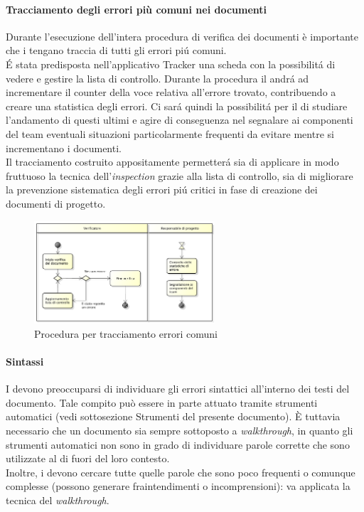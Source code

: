 			\paragraph{Tracciamento degli errori più comuni nei documenti}
			Durante l'esecuzione dell'intera procedura di verifica dei documenti è importante che i  tengano traccia di tutti gli errori pi\'u comuni. \\
			\'E stata predisposta nell'applicativo Tracker una scheda con la possibilit\'a di vedere e gestire la lista di controllo. Durante la procedura il  andr\'a ad incrementare il counter della voce relativa all'errore trovato, contribuendo a creare una statistica degli errori. Ci sar\'a quindi la possibilit\'a per il  di studiare l'andamento di questi ultimi e agire di conseguenza nel segnalare ai componenti del team eventuali situazioni particolarmente frequenti da evitare mentre si incrementano i documenti.\\
			Il tracciamento costruito appositamente permetter\'a sia di applicare in modo fruttuoso la tecnica dell'\textit{inspection} grazie alla lista di controllo, sia di migliorare la prevenzione sistematica degli errori pi\'u critici in fase di creazione dei documenti di progetto.
			\begin{figure}[H]
					\centering
					\includegraphics[width=0.6\textwidth]{NormeDiProgetto/Pics/ProceduraDecrementoErrori}
					\caption{Procedura per tracciamento errori comuni}
			\end{figure}
			\paragraph{Sintassi}
				I  devono preoccuparsi di individuare gli errori sintattici all'interno dei testi del documento. Tale compito può essere in parte attuato tramite strumenti automatici (vedi sottosezione Strumenti del presente documento). È tuttavia necessario che un documento sia sempre sottoposto a \textit{walkthrough}, in quanto gli strumenti automatici non sono in grado di individuare parole corrette che sono utilizzate al di fuori del loro contesto.\\
				Inoltre, i  devono cercare tutte quelle parole che sono poco frequenti o comunque complesse (possono generare fraintendimenti o incomprensioni): va applicata la tecnica del \textit{walkthrough}.
